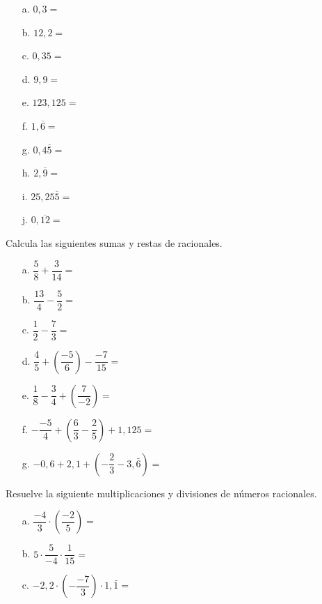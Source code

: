 \documentclass[spanish,letterpaper, 11pt, addpoints, answers]{exam}
\begin{document}
\begin{questions}
\begin{multicols}{2}
\begin{itemize}
  \item[a.] $0,3=$
  \item[b.] $12,2=$
  \item[c.] $0,35=$
  \item[d.] $9,9=$
  \item[e.] $123,125=$
  \item[f.] $1,\overline{6}=$
  \item[g.] $0,4\overline{5}=$
  \item[h.] $2,\overline{9}=$
  \item[i.] $25,25\overline{5}=$
  \item[j.] $0,\overline{12}=$  
\end{itemize}
\end{multicols}

\question Calcula las siguientes sumas y restas de racionales.

\begin{multicols}{2}
  

\begin{itemize}
\item[a.]$\dfrac{5}{8}+\dfrac{3}{14}=$
\item[b.]$\dfrac{13}{4}-\dfrac{5}{2}=$
\item[c.]$\dfrac{1}{2}-\dfrac{7}{3}=$
\item[d.]$\dfrac{4}{5}+\left(\dfrac{-5}{6}\right)-\dfrac{-7}{15}=$
\item[e.]$\dfrac{1}{8}-\dfrac{3}{4}+\left(\dfrac{7}{-2}\right)=$
\item[f.]$-\dfrac{-5}{4}+\left(\dfrac{6}{3}-\dfrac{2}{5}\right)+1{,}125=$
\item[g.]$-0{,}6+2{,}1+(-\dfrac{2}{3}-3{,}\bar{6})=$  
\end{itemize}
\end{multicols}

\question Resuelve la siguiente multiplicaciones y divisiones de números racionales.
\begin{multicols}{2}
  

\begin{itemize}
\item[a.] $\dfrac{-4}{3}\cdot \left(\dfrac{-2}{5}\right)=$

\item[b.] $5\cdot \dfrac{5}{-4}\cdot \dfrac{1}{15}=$

\item[c.] $-2{,}2\cdot \left(-\dfrac{-7}{3}\right)\cdot 1{,}\bar{1}=$


\end{itemize}
\end{multicols}
\end{questions}
\end{document}
